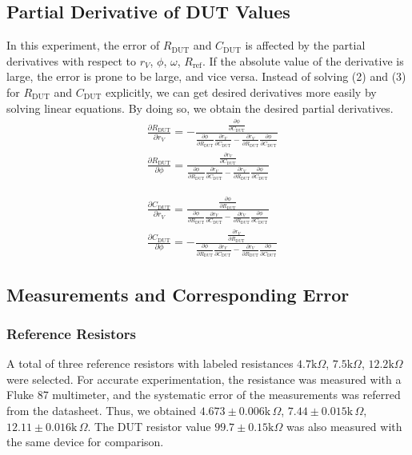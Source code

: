 \documentclass[%
 aip,
 amsmath,amssymb,
 reprint,%
]{revtex4-1}
\begin{document}
\subsection{Partial Derivative of DUT Values}

In this experiment, the error of $R_{\textrm{DUT}}$ and $C_{\textrm{DUT}}$ is affected by the partial derivatives with respect to $r_{V}$, $\phi$, $\omega$, $R_{\textrm{ref}}$. If the absolute value of the derivative is large, the error is prone to be large, and vice versa.  Instead of solving (2) and (3) for $R_{\textrm{DUT}}$ and $C_{\textrm{DUT}}$ explicitly, we can get desired derivatives more easily by solving linear equations. By doing so, we obtain the desired partial derivatives.
\begin{align}
&\frac{\partial R_{\textrm{DUT}}}{\partial r_{V}}=-\frac{\frac{\partial \phi}{\partial C_{\textrm{DUT}}}}{\frac{\partial \phi}{\partial R_{\textrm{DUT}}}\frac{\partial r_{V}}{\partial C_{\textrm{DUT}}} - \frac{\partial r_{V}}{\partial R_{\textrm{DUT}}}\frac{\partial \phi}{\partial C_{\textrm{DUT}}}}\\
&\frac{\partial R_{\textrm{DUT}}}{\partial \phi}=\frac{\frac{\partial r_{V}}{\partial C_{\textrm{DUT}}}}{\frac{\partial \phi}{\partial R_{\textrm{DUT}}}\frac{\partial r_{V}}{\partial C_{\textrm{DUT}}} - \frac{\partial r_{V}}{\partial R_{\textrm{DUT}}}\frac{\partial \phi}{\partial C_{\textrm{DUT}}}}
\end{align}

\begin{align}
&\frac{\partial C_{\textrm{DUT}}}{\partial r_{V}}=\frac{\frac{\partial \phi}{\partial R_{\textrm{DUT}}}}{\frac{\partial \phi}{\partial R_{\textrm{DUT}}}\frac{\partial r_{V}}{\partial C_{\textrm{DUT}}} - \frac{\partial r_{V}}{\partial R_{\textrm{DUT}}}\frac{\partial \phi}{\partial C_{\textrm{DUT}}}}\\
&\frac{\partial C_{\textrm{DUT}}}{\partial \phi}=-\frac{\frac{\partial r_{V}}{\partial R_{\textrm{DUT}}}}{\frac{\partial \phi}{\partial R_{\textrm{DUT}}}\frac{\partial r_{V}}{\partial C_{\textrm{DUT}}} - \frac{\partial r_{V}}{\partial R_{\textrm{DUT}}}\frac{\partial \phi}{\partial C_{\textrm{DUT}}}}
\end{align}


\subsection{Measurements and Corresponding Error}
\subsubsection{Reference Resistors}
A total of three reference resistors with labeled resistances $4.7\text{k}\Omega$, $7.5\text{k}\Omega$, $12.2\text{k}\Omega$ were selected. For accurate experimentation, the resistance was measured with a Fluke 87 multimeter, and the systematic error of the measurements was referred from the datasheet\cite{multimeter}. Thus, we obtained $4.673\pm0.006\text{k}\,\Omega$, $7.44\pm0.015\text{k}\,\Omega$, $12.11\pm0.016\text{k}\,\Omega$. 
The DUT resistor value $99.7\pm0.15\text{k}\Omega$ was also measured with the same device for comparison.
\end{document}
